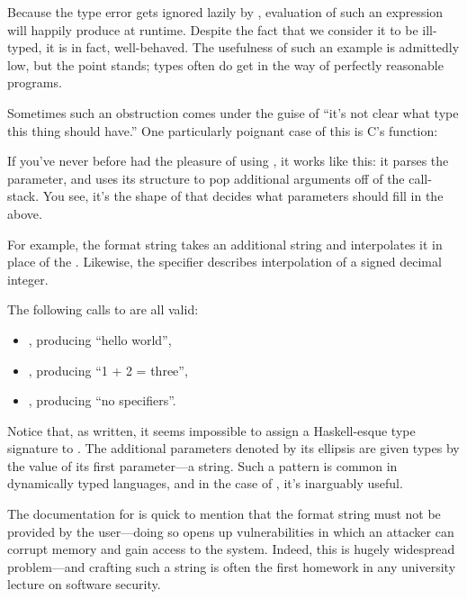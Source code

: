 \documentclass[book.tex]{subfiles}
\begin{document}
Because the type error gets ignored lazily by , evaluation of such an
expression will happily produce  at runtime. Despite the fact
that we consider it to be ill-typed, it is in fact, well-behaved. The usefulness
of such an example is admittedly low, but the point stands; types often do get
in the way of perfectly reasonable programs.

Sometimes such an obstruction comes under the guise of ``it's not clear what
type this thing should have.'' One particularly poignant case of this is C's
 function:

\begin{center}
\end{center}

If you've never before had the pleasure of using , it works like
this: it parses the  parameter, and uses its structure to pop
additional arguments off of the call-stack. You see, it's the shape of
 that decides what parameters should fill in the  above.

For example, the format string  takes an additional string and
interpolates it in place of the . Likewise, the specifier 
describes interpolation of a signed decimal integer.

The following calls to  are all valid:

\begin{itemize}
  \item{, producing ``hello world'',}
  \item{, producing ``1 + 2 =
    three'',}
  \item{, producing ``no specifiers''.}
\end{itemize}

Notice that, as written, it seems impossible to assign a Haskell-esque type
signature to . The additional parameters denoted by its ellipsis are
given types by the value of its first parameter---a string. Such a pattern is
common in dynamically typed languages, and in the case of , it's
inarguably useful.

The documentation for  is quick to mention that the format string
must not be provided by the user---doing so opens up vulnerabilities in which an
attacker can corrupt memory and gain access to the system. Indeed, this is
hugely widespread problem---and crafting such a string is often the first
homework in any university lecture on software security.
\end{document}
